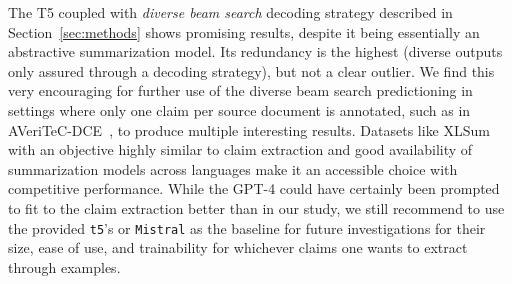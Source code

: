 The T5 coupled with \textit{diverse beam search} decoding strategy described in Section~\ref{sec:methods} shows promising results, despite it being essentially an abstractive summarization model.
Its redundancy is the highest (diverse outputs only assured through a decoding strategy), but not a clear outlier.
We find this very encouraging for further use of the diverse beam search predictioning in settings where only one claim per source document is annotated, such as in AVeriTeC-DCE~\cite{deng-etal-2024-document}, to produce multiple interesting results.
Datasets like XLSum~\cite{hasan-etal-2021-xl} with an objective highly similar to claim extraction and good availability of summarization models across languages make it an accessible choice with competitive performance.
While the GPT-4 could have certainly been prompted to fit to the \ds{} claim extraction better than in our study, we still recommend to use the provided \texttt{t5}'s or \texttt{Mistral} as the baseline for future investigations for their size, ease of use, and trainability for whichever claims one wants to extract through examples.   

\begin{comment}
    \begin{table*}
    \centering

    \begin{tabular}{l|cccc|cccc}
        & \multicolumn{4}{c|}{\s{Automated Metrics}} & \multicolumn{4}{c}{\s{Gold Annotations}} \\
        {Model}                                           & $A$        & $G$      & $D$      & $Faith$ & $A_g$     & $G_g$    & $D_g$    & $F_g$    \\
        \hline           
        \footnotesize{\texttt{qacg}}                      & 0.89       & 0.69     & 0.70     & 0.88    & 0.99      & 0.85     & 0.91     & 0.76     \\
        \footnotesize{\texttt{gpt-4-turbo-3-shot}}        & 0.92       & 0.70     & 0.77     & \s{0.99}& 0.98      & \s{0.97} & \s{0.96} & \s{0.93} \\
        \footnotesize{\texttt{qlora-mistral-instruct}}    & 0.95       & 0.75     & 0.80     & 0.95    & \s{1.00}  & 0.96     & \s{0.96} & 0.90     \\
        \footnotesize{\texttt{t5\_sm\_diverse\_7\_beams}} & 0.95       & 0.74     & 0.80     & 0.91    & 0.99      & 0.89     & 0.95     & 0.79     \\
        \footnotesize{\texttt{t5\_sm\_multi-claim}}       & \s{0.96}   & \s{0.76} & \s{0.82} & 0.95    & \s{1.00}  & 0.91     & 0.94     & 0.88     \\
        \hline
    \end{tabular}
    \caption{\label{model-comparison-bin}
        Model comparison on means of model metrics over all samples (or over all annotated samples). In bold are the best values for each metric.}
\end{table*}


\end{comment}





